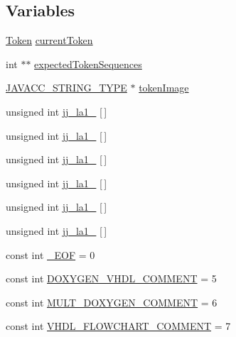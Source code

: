 \subsection*{Variables}
\begin{DoxyCompactItemize}
\item 
\hyperlink{classvhdl_1_1parser_1_1_token}{Token} \hyperlink{namespacevhdl_1_1parser_a755fe3544d80cddda9e786987778a339}{current\+Token}
\item 
int $\ast$$\ast$ \hyperlink{namespacevhdl_1_1parser_a6a6b17519585a72d65436b2b57a2f9ba}{expected\+Token\+Sequences}
\item 
\hyperlink{_java_c_c_8h_a7941da0682a76ffa9869d8458e166062}{J\+A\+V\+A\+C\+C\+\_\+\+S\+T\+R\+I\+N\+G\+\_\+\+T\+Y\+P\+E} $\ast$ \hyperlink{namespacevhdl_1_1parser_a2548f7c763a6da6b5dc5a887a92c297b}{token\+Image}
\item 
unsigned int \hyperlink{namespacevhdl_1_1parser_a48bdc5c58eb15649c61b2d623bcbdc29}{jj\+\_\+la1\+\_} \mbox{[}$\,$\mbox{]}
\item 
unsigned int \hyperlink{namespacevhdl_1_1parser_a49f05db6f0680c2723cb125a109a48fa}{jj\+\_\+la1\+\_} \mbox{[}$\,$\mbox{]}
\item 
unsigned int \hyperlink{namespacevhdl_1_1parser_a2ce8ed90b801cc69d059b4f3732c8da3}{jj\+\_\+la1\+\_} \mbox{[}$\,$\mbox{]}
\item 
unsigned int \hyperlink{namespacevhdl_1_1parser_ab8a4cb3eb6e58082964968187e10d5cd}{jj\+\_\+la1\+\_} \mbox{[}$\,$\mbox{]}
\item 
unsigned int \hyperlink{namespacevhdl_1_1parser_abf4cc2c3f20ef53df8d9f8d6c5998beb}{jj\+\_\+la1\+\_} \mbox{[}$\,$\mbox{]}
\item 
unsigned int \hyperlink{namespacevhdl_1_1parser_a625decea2d793f0d02d0ea61a7d4f12a}{jj\+\_\+la1\+\_} \mbox{[}$\,$\mbox{]}
\item 
const int \hyperlink{namespacevhdl_1_1parser_a3e4ca88943b20b46f48a1f70b1df4647}{\+\_\+\+E\+O\+F} = 0
\item 
const int \hyperlink{namespacevhdl_1_1parser_a2d0a0373c10977aef4364020b1c39fe0}{D\+O\+X\+Y\+G\+E\+N\+\_\+\+V\+H\+D\+L\+\_\+\+C\+O\+M\+M\+E\+N\+T} = 5
\item 
const int \hyperlink{namespacevhdl_1_1parser_acc2140317ed8d4ec2a249a40e10431ce}{M\+U\+L\+T\+\_\+\+D\+O\+X\+Y\+G\+E\+N\+\_\+\+C\+O\+M\+M\+E\+N\+T} = 6
\item 
const int \hyperlink{namespacevhdl_1_1parser_a477905847fb4d2e3aab22091506e7041}{V\+H\+D\+L\+\_\+\+F\+L\+O\+W\+C\+H\+A\+R\+T\+\_\+\+C\+O\+M\+M\+E\+N\+T} = 7
$$
\end{DoxyCompactItemize}
